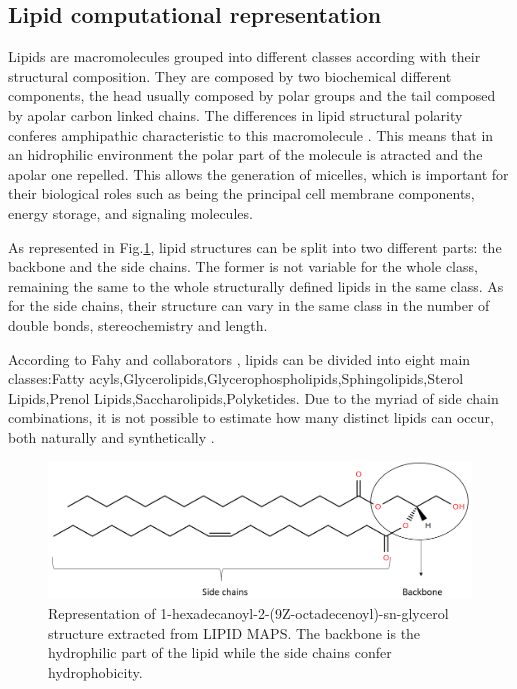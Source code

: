 \documentclass{llncs}
\begin{document}
\subsection{Lipid computational representation}
Lipids are macromolecules grouped into different classes according with their structural composition. 
They are composed by two biochemical different components, the head usually composed by polar groups and the tail composed by apolar carbon linked chains.  
The differences in lipid structural polarity conferes amphipathic characteristic to this macromolecule \cite{Fahy2011,Capela2022}. 
This means that in an hidrophilic environment the polar part of the molecule is atracted and the apolar one repelled.
This allows the generation of micelles, which is important for their biological roles such as being the principal cell membrane components, energy storage, and signaling molecules.

As represented in Fig.\ref{fig1}, lipid structures can be split into two different parts: the backbone and the side chains. The former is not variable for the whole class, remaining the same to the whole structurally defined lipids in the same class.
As for the side chains, their structure can vary in the same class in the number of double bonds, stereochemistry and length.

According to Fahy and collaborators \cite{Fahy2009}, lipids can be divided into eight main classes:Fatty acyls,Glycerolipids,Glycerophospholipids,Sphingolipids,Sterol Lipids,Prenol Lipids,Saccharolipids,Polyketides. 
Due to the myriad of side chain combinations, it is not possible to estimate how many distinct lipids can occur, both naturally and synthetically \cite{Gyamfi2018}.

\begin{figure}
    \includegraphics[width=\textwidth]{imagens/lipido.png}
    \caption{Representation of 1-hexadecanoyl-2-(9Z-octadecenoyl)-sn-glycerol structure extracted from LIPID MAPS. The backbone is the hydrophilic part of the lipid while the side chains confer hydrophobicity.} \label{fig1}
\end{figure}
\end{document}
